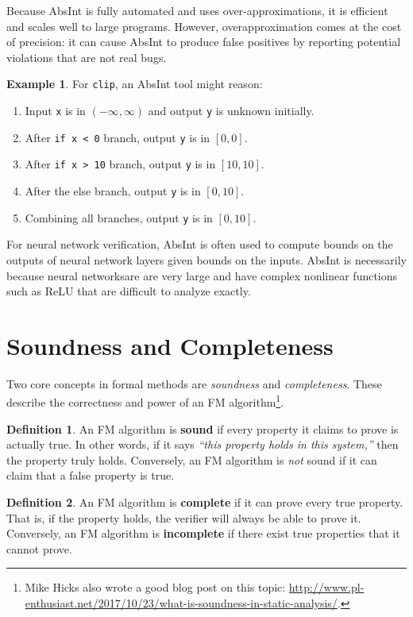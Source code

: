 \documentclass[oneside,11pt,dvipsnames]{book}
\numberwithin{equation}{section}
\theoremstyle{definition}
\newtheorem{definition}{Definition}[section]
\newtheorem{example}{Example}[section]
\theoremstyle{remark}
\newcommand{\code}[1]{\texttt{#1}}
\begin{document}
Because AbsInt is fully automated and uses over-approximations, it is efficient and scales well to large programs. However, overapproximation comes at the cost of precision: it can cause AbsInt to produce false positives by reporting potential violations that are not real bugs.


\begin{example}
For \code{clip}, an AbsInt tool might reason:
\begin{enumerate}
    \item Input \code{x} is in $(-\infty, \infty)$ and output \code{y} is unknown initially.
    \item After \code{if x < 0} branch, output \code{y} is in $[0, 0]$.
    \item After \code{if x > 10} branch, output \code{y} is in $[10, 10]$.
    \item After the else branch, output \code{y} is in $[0, 10]$.
    \item Combining all branches, output \code{y} is in $[0, 10]$.
\end{enumerate}
\end{example}

For neural network verification, AbsInt is often used to compute bounds on the outputs of neural network layers given bounds on the inputs. AbsInt is necessarily because neural networksare are very large and have complex nonlinear functions such as ReLU that are difficult to analyze exactly.

\section{Soundness and Completeness}

Two core concepts in formal methods are \emph{soundness} and \emph{completeness}. These describe the correctness and power of an FM algorithm\footnote{Mike Hicks also wrote a good blog post on this topic: \url{http://www.pl-enthusiast.net/2017/10/23/what-is-soundness-in-static-analysis/}.}.

\begin{definition}
An FM algorithm is \textbf{sound} if every property it claims to prove is actually true. In other words, if it says \emph{``this property holds in this system,''} then the property truly holds. Conversely, an FM algorithm is \emph{not} sound if it can claim that a false property is true.
\end{definition}



\begin{definition}
An FM algorithm is \textbf{complete} if it can prove every true property. That is, if the property holds, the verifier will always be able to prove it. Conversely, an FM algorithm is \textbf{incomplete} if there exist true properties that it cannot prove.
\end{definition}
\end{document}
